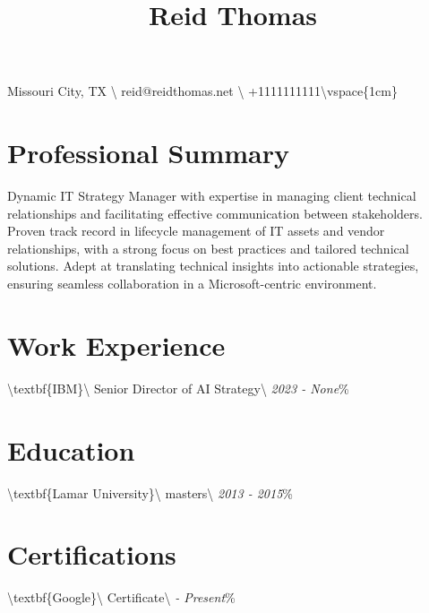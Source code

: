 \documentclass{article}%
\title{Reid Thomas}%
\date{}%
\begin{document}
%
\normalsize%
\maketitle%
Missouri City, TX \textbackslash{} reid@reidthomas.net \textbackslash{} +1111111111\textbackslash{}vspace\{1cm\}%
\section*{Professional Summary}%
\label{sec:ProfessionalSummary}%
Dynamic IT Strategy Manager with expertise in managing client technical relationships and facilitating effective communication between stakeholders. Proven track record in lifecycle management of IT assets and vendor relationships, with a strong focus on best practices and tailored technical solutions. Adept at translating technical insights into actionable strategies, ensuring seamless collaboration in a Microsoft{-}centric environment.

%
\section*{Work Experience}%
\label{sec:WorkExperience}%
\textbackslash{}textbf\{IBM\}\textbackslash{}%
Senior Director of AI Strategy\textbackslash{}%
\textit{2023 - None}\%
\vspace{0.5em}

%
\section*{Education}%
\label{sec:Education}%
\textbackslash{}textbf\{Lamar University\}\textbackslash{}%
masters\textbackslash{}%
\textit{2013 - 2015}\%
\vspace{0.5em}

%
\section*{Certifications}%
\label{sec:Certifications}%
\textbackslash{}textbf\{Google\}\textbackslash{}%
Certificate\textbackslash{}%
\textit{ - Present}\%
\vspace{0.5em}

%
\end{document}
